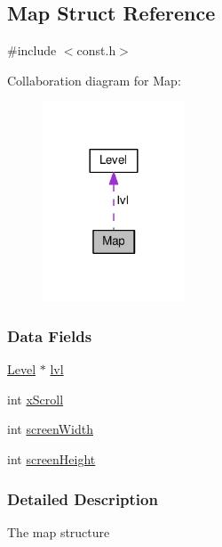 \hypertarget{struct_map}{\subsection{Map Struct Reference}
\label{struct_map}
}


{\ttfamily \#include $<$const.\-h$>$}



Collaboration diagram for Map\-:\nopagebreak
\begin{figure}[H]
\begin{center}
\leavevmode
\includegraphics[width=120pt]{struct_map__coll__graph}
\end{center}
\end{figure}
\subsubsection*{Data Fields}
\begin{DoxyCompactItemize}
\item 
\hyperlink{struct_level}{Level} $\ast$ \hyperlink{struct_map_abca19b7de8e60347a507d1aeff95c764}{lvl}
\item 
int \hyperlink{struct_map_aa83bbdf2603e42824cd0bab44bf315c2}{x\-Scroll}
\item 
int \hyperlink{struct_map_ae50cb92a78d9e0a4f4bd718fc02bd294}{screen\-Width}
\item 
int \hyperlink{struct_map_a9ebc1dbd77788c4bfa27758a6725413f}{screen\-Height}
\end{DoxyCompactItemize}


\subsubsection{Detailed Description}
The map structure 

